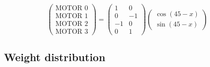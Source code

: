\documentclass[a4paper,12pt]{article}
\begin{document}
$$\begin{pmatrix}
\text{MOTOR 0}\\ 
\text{MOTOR 1}\\ 
\text{MOTOR 2}\\ 
\text{MOTOR 3}
\end{pmatrix}=
\begin{pmatrix}
1 & 0\\ 
0 & -1\\ 
-1 & 0\\ 
0 & 1 
\end{pmatrix}
\begin{pmatrix}
\cos(45-x)\\ 
\sin(45-x)
\end{pmatrix}$$

\subsection{Weight distribution}
\end{document}
